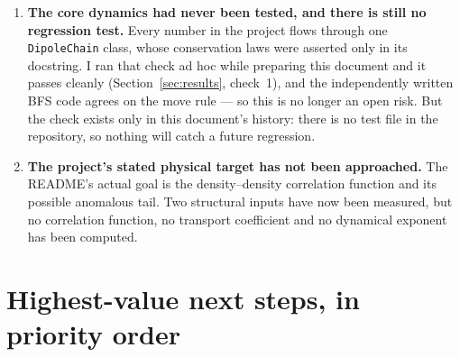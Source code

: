 \documentclass[11pt,a4paper]{article}
\begin{document}
\begin{enumerate}
\item \textbf{The core dynamics had never been tested, and there is still
no regression test.} Every number in the project flows through one
\texttt{DipoleChain} class, whose conservation laws were asserted only in
its docstring. I ran that check ad hoc while preparing this document and it
passes cleanly (Section~\ref{sec:results}, check~1), and the independently
written BFS code agrees on the move rule --- so this is no longer an open
risk. But the check exists only in this document's history: there is no test
file in the repository, so nothing will catch a future regression.

\item \textbf{The project's stated physical target has not been approached.}
The README's actual goal is the density--density correlation function and
its possible anomalous tail. Two structural inputs have now been measured,
but no correlation function, no transport coefficient and no dynamical
exponent has been computed.
\end{enumerate}

\section{Highest-value next steps, in priority order}
\end{document}
